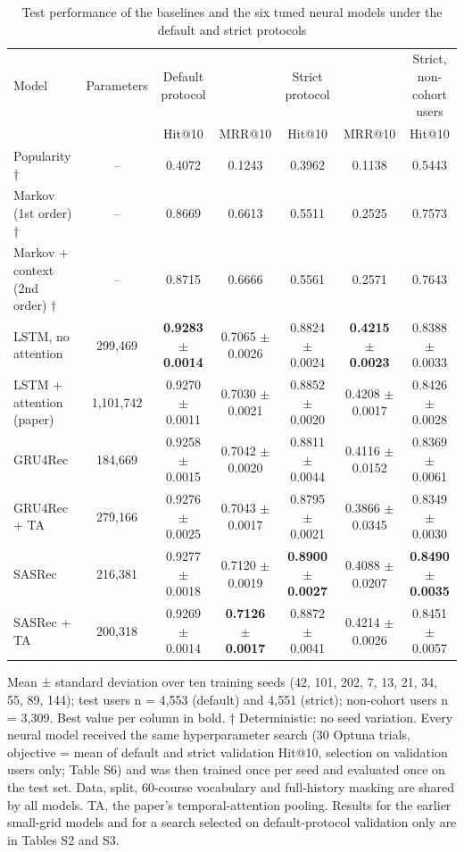 \begin{table}[t]\centering\footnotesize
\caption{Test performance of the baselines and the six tuned neural models under the default and strict protocols}
\begin{tabular}{lcccccc}\toprule
Model & Parameters & Default protocol &  & Strict protocol &  & Strict, non-cohort users \\
 &  & Hit@10 & MRR@10 & Hit@10 & MRR@10 & Hit@10 \\
\midrule
Popularity † & – & 0.4072 & 0.1243 & 0.3962 & 0.1138 & 0.5443 \\
Markov (1st order) † & – & 0.8669 & 0.6613 & 0.5511 & 0.2525 & 0.7573 \\
Markov + context (2nd order) † & – & 0.8715 & 0.6666 & 0.5561 & 0.2571 & 0.7643 \\
LSTM, no attention & 299,469 & \textbf{0.9283 $\pm$ 0.0014} & 0.7065 $\pm$ 0.0026 & 0.8824 $\pm$ 0.0024 & \textbf{0.4215 $\pm$ 0.0023} & 0.8388 $\pm$ 0.0033 \\
LSTM + attention (paper) & 1,101,742 & 0.9270 $\pm$ 0.0011 & 0.7030 $\pm$ 0.0021 & 0.8852 $\pm$ 0.0020 & 0.4208 $\pm$ 0.0017 & 0.8426 $\pm$ 0.0028 \\
GRU4Rec & 184,669 & 0.9258 $\pm$ 0.0015 & 0.7042 $\pm$ 0.0020 & 0.8811 $\pm$ 0.0044 & 0.4116 $\pm$ 0.0152 & 0.8369 $\pm$ 0.0061 \\
GRU4Rec + TA & 279,166 & 0.9276 $\pm$ 0.0025 & 0.7043 $\pm$ 0.0017 & 0.8795 $\pm$ 0.0021 & 0.3866 $\pm$ 0.0345 & 0.8349 $\pm$ 0.0030 \\
SASRec & 216,381 & 0.9277 $\pm$ 0.0018 & 0.7120 $\pm$ 0.0019 & \textbf{0.8900 $\pm$ 0.0027} & 0.4088 $\pm$ 0.0207 & \textbf{0.8490 $\pm$ 0.0035} \\
SASRec + TA & 200,318 & 0.9269 $\pm$ 0.0014 & \textbf{0.7126 $\pm$ 0.0017} & 0.8872 $\pm$ 0.0041 & 0.4214 $\pm$ 0.0026 & 0.8451 $\pm$ 0.0057 \\
\bottomrule
\end{tabular}
\par\smallskip\footnotesize Mean ± standard deviation over ten training seeds (42, 101, 202, 7, 13, 21, 34, 55, 89, 144); test users n = 4,553 (default) and 4,551 (strict); non-cohort users n = 3,309. Best value per column in bold. † Deterministic: no seed variation. Every neural model received the same hyperparameter search (30 Optuna trials, objective = mean of default and strict validation Hit@10, selection on validation users only; Table S6) and was then trained once per seed and evaluated once on the test set. Data, split, 60-course vocabulary and full-history masking are shared by all models. TA, the paper's temporal-attention pooling. Results for the earlier small-grid models and for a search selected on default-protocol validation only are in Tables S2 and S3.
\end{table}